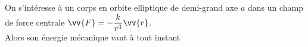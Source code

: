 \documentclass[a4paper]{article}
\begin{document}
\pagestyle{fancy}
\fancyhf{}
\setlength{\headheight}{15pt}

\begin{center}
	\large{}
\end{center}


On s'intéresse à un corps en orbite elliptique de demi-grand axe \(a\) dans un champ de force centrale \(\vv{F}=-\dfrac{k}{r^3}\vv{r}\).\\
Alors son énergie mécanique vaut à tout instant 
\end{document}
